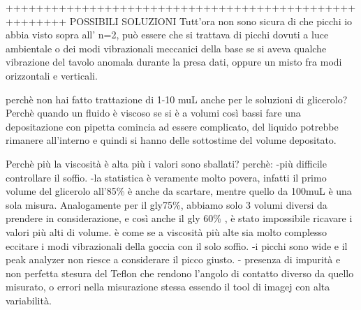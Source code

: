 ++++++++++++++++++++++++++++++++++++++++++++++++++++++
POSSIBILI SOLUZIONI
Tutt'ora non sono sicura di che picchi io abbia visto sopra all' n=2, può essere che si trattava di picchi dovuti a luce ambientale o dei modi vibrazionali meccanici della base se si aveva qualche vibrazione del tavolo anomala durante la presa dati, oppure un misto fra modi orizzontali e verticali.

perchè non hai fatto trattazione di 1-10 muL anche per le soluzioni di glicerolo? Perchè quando un fluido è viscoso se si è a volumi così bassi fare una depositazione con pipetta comincia ad essere complicato, del liquido potrebbe rimanere all'interno e quindi si hanno delle sottostime del volume depositato.

Perchè più la viscosità è alta più i valori sono sballati?
perchè:
-più difficile controllare il soffio. 
-la statistica è veramente molto povera, infatti il primo volume del glicerolo all'85\% è anche da scartare, mentre quello da 100muL è una sola misura. Analogamente per il gly75\%, abbiamo solo 3 volumi diversi da prendere in considerazione, e così anche il gly 60\% , è stato impossibile ricavare i valori più alti di volume. è come se a viscosità più alte sia molto complesso eccitare i modi vibrazionali della goccia con il solo soffio.
-i picchi sono wide e il peak analyzer non riesce a considerare il picco giusto.
- presenza di impurità e non perfetta stesura del Teflon che rendono l'angolo di contatto diverso da quello misurato, o errori nella misurazione stessa essendo il tool di imagej con alta variabilità.
